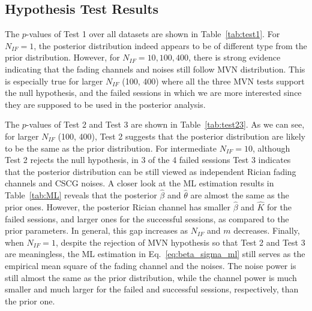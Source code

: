 \documentclass[journal,draftcls,onecolumn,12pt,twoside]{IEEEtran}
\begin{document}
\subsection{Hypothesis Test Results}
The $p$-values of Test 1 over all datasets are shown in Table~\ref{tab:test1}.
For $N_{IF} = 1$, the posterior distribution indeed appears to be of different
type from the prior distribution. However, for $N_{IF} = 10, 100, 400$, there is
strong evidence indicating that the fading channels and noises still follow MVN
distribution. This is especially true for larger $N_{IF}$ (100, 400) where all
the three MVN tests support the null hypothesis, and the failed sessions
in which we are more interested since they are supposed to be used in the
posterior analysis.

The $p$-values of Test 2 and Test 3 are shown in Table~\ref{tab:test23}. As we can see, for larger $N_{IF}$
 (100, 400), Test 2 suggests that the posterior distribution are likely to be
the same as the prior distribution. For intermediate $N_{IF} = 10$, although
Test 2 rejects the null hypothesis, in 3 of the 4 failed sessions Test 3
indicates that the posterior distribution can be still viewed as independent Rician fading
channels and CSCG noises. A closer look at the ML estimation results
in Table~\ref{tab:ML} reveals that the posterior $\hat{\beta}$ and
$\hat{\theta}$ are almost the same as the prior ones. However, the posterior
Rician channel has smaller $\hat{\beta}$ and $\hat{K}$ for the failed sessions,
and larger ones for the successful sessions, as compared to the prior
parameters.
In general, this gap increases as $N_{IF}$ and $m$ decreases. Finally, when
$N_{IF} = 1$, despite the rejection of MVN hypothesis so that Test 2 and Test 3
are meaningless, the ML estimation in Eq.~\eqref{eq:beta_sigma_ml} still serves
as the empirical mean square of the fading channel and the noises. The noise
power is still almost the same as the prior distribution, while the channel
power is much smaller and much larger for the failed and successful
sessions, respectively, than the prior one.
\end{document}
